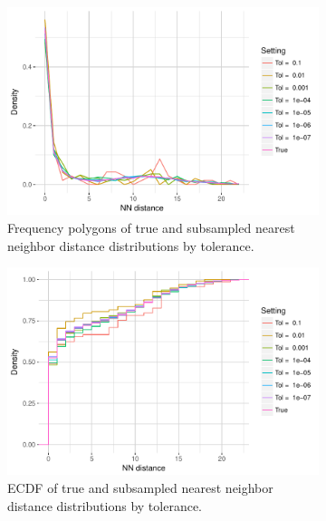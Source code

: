 \documentclass{article}
\begin{document}
\begin{figure}
    \begin{subfigure}{.49\textwidth}
        \includegraphics[width=\linewidth]{Figures/NearestNeighbor/CDR3/freqpoly_by_tol.pdf}
   		\caption{Frequency polygons of true and subsampled nearest neighbor distance distributions by tolerance.}
    	\label{fig:NNFreqPoly}
    \end{subfigure}
    \begin{subfigure}{.49\textwidth}
        \includegraphics[width=\linewidth]{Figures/NearestNeighbor/CDR3/ecdf_by_tol.pdf}
    	\caption{ECDF of true and subsampled nearest neighbor distance distributions by tolerance.}
    	\label{fig:NNECDF}
    \end{subfigure}
    \begin{subfigure}{.49\textwidth}

\end{subfigure}
\end{figure}
\end{document}
